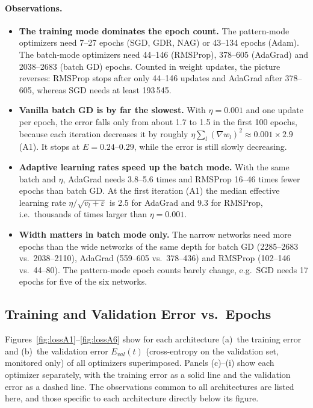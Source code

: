 \documentclass[runningheads]{llncs}
\begin{document}
\paragraph{Observations.}
\begin{itemize}
\item \textbf{The training mode dominates the epoch count.} The pattern-mode optimizers need 7--27
epochs (SGD, GDR, NAG) or 43--134 epochs (Adam). The batch-mode optimizers need 44--146 (RMSProp),
378--605 (AdaGrad) and 2038--2683 (batch GD) epochs. Counted in weight updates, the picture
reverses: RMSProp stops after only 44--146 updates and AdaGrad after 378--605, whereas SGD needs at
least 193\,545.
\item \textbf{Vanilla batch GD is by far the slowest.} With $\eta=0.001$ and one update per epoch,
the error falls only from about 1.7 to 1.5 in the first 100 epochs, because each iteration decreases
it by roughly $\eta\sum_l(\nabla w_l)^2\approx0.001\times2.9$ (A1). It stops at $E=0.24$--$0.29$,
while the error is still slowly decreasing.
\item \textbf{Adaptive learning rates speed up the batch mode.} With the same batch and $\eta$,
AdaGrad needs 3.8--5.6 times and RMSProp 16--46 times fewer epochs than batch GD. At the first
iteration (A1) the median effective learning rate $\eta/\sqrt{v_l+\varepsilon}$ is 2.5 for AdaGrad
and 9.3 for RMSProp, i.e.\ thousands of times larger than $\eta=0.001$.
\item \textbf{Width matters in batch mode only.} The narrow networks need more epochs than the wide
networks of the same depth for batch GD (2285--2683 vs.\ 2038--2110), AdaGrad (559--605 vs.\
378--436) and RMSProp (102--146 vs.\ 44--80). The pattern-mode epoch counts barely change, e.g.\ SGD
needs 17 epochs for five of the six networks.
\end{itemize}

\subsection{Training and Validation Error vs.\ Epochs}
Figures~\ref{fig:lossA1}--\ref{fig:lossA6} show for each architecture (a)~the training error and
(b)~the validation error $E_{val}(t)$ (cross-entropy on the validation set, monitored only) of all
optimizers superimposed. Panels (c)--(i) show each optimizer separately, with the training error as
a solid line and the validation error as a dashed line. The observations common to all architectures
are listed here, and those specific to each architecture directly below its figure.
\end{document}
